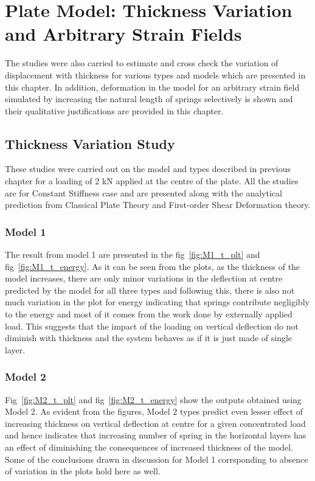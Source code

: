 \chapter{Plate Model: Thickness Variation and Arbitrary Strain Fields}

The studies were also carried to estimate and cross check the variation of displacement with thickness for various types and models which are presented in this chapter. In addition, deformation in the model for an arbitrary strain field simulated by increasing the natural length of springs selectively is shown and their qualitative justifications are provided in this chapter.

\section{Thickness Variation Study}
 These studies were carried out on the model and types described in previous chapter for a loading of 2 kN applied at the centre of the plate. All the studies are for Constant Stiffness case and are presented along with the analytical prediction from Classical Plate Theory and First-order Shear Deformation theory.
 
 \subsection{Model 1}
 The result from model 1 are presented in the fig~\ref{fig:M1_t_plt} and fig~\ref{fig:M1_t_energy}. As it can be seen from the plots, as the thickness of the model increases, there are only minor variations in the deflection at centre predicted by the model for all three types and following this, there is also not much variation in the plot for energy indicating that springs contribute negligibly to the energy and most of it comes from the work done by externally applied load. This suggests that the impact of the loading on vertical deflection do not diminish with thickness and the system behaves as if it is just made of single layer. 
 
  \subsection{Model 2}
 Fig~\ref{fig:M2_t_plt} and fig~\ref{fig:M2_t_energy} show the outputs obtained using Model 2. As evident from the figures, Model 2 types predict even lesser effect of increasing thickness on vertical deflection at centre for a given concentrated load and hence indicates that increasing number of spring in the horizontal layers has an effect of diminishing the consequences of increased thickness of the model. Some of the conclusions drawn in discussion for Model 1 corrsponding to absence of variation in the plots hold here as well.
 
